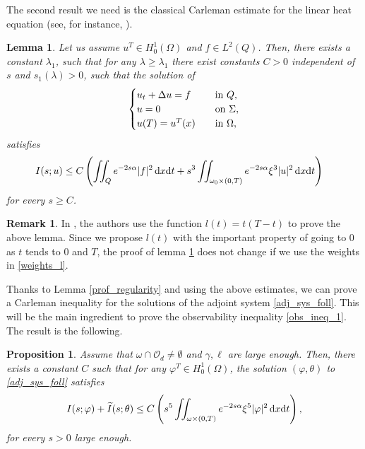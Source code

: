 \documentclass{dcds-bOF}
\newtheorem{lemma}[theorem]{Lemma}
\newtheorem{proposition}{Proposition}
\theoremstyle{definition}
\newtheorem{remark}{Remark}
\def\dx{\,\textnormal{d}x}
\def\dt{\textnormal{d}t}
\begin{document}
The second result we need is the classical Carleman estimate for the linear heat equation (see, for instance, \cite{fursi,cara_guerrero}).
\begin{lemma}\label{2once}
Let us assume $u^T\in H_0^1(\Omega)$ and $f\in L^2(Q)$. Then, there exists a constant $\lambda_1$, such that for any $\lambda\geq \lambda_1$ there exist constants $C>0$ independent of $s$ and $s_1(\lambda)>0$, such that the solution of
%
\begin{equation}\label{sys_u}
\begin{cases}
u_t+\Delta u=f \quad& \textnormal{in } Q, \\
u=0 \quad& \textnormal{on } \Sigma, \\
u(T)=u^T(x) \quad& \textnormal{in } \Omega,
\end{cases}
\end{equation}
%
satisfies
%
\begin{equation}\label{car_clasica}
\begin{split}
I(s;u)\leq C&\left(\iint_Qe^{-2s\alpha}|f|^2\dx\dt+s^3\iint_{\omega_0\times(0,T)}e^{-2s\alpha}\xi^3|u|^2\dx\dt\right)
\end{split}
\end{equation}
%
for every $s\geq C$.
\end{lemma}
%
\begin{remark}
In \cite{fursi,cara_guerrero}, the authors use the function $l(t)=t(T-t)$ to prove the above lemma. Since we propose $l(t)$ with the important property of going to $0$ as $t$ tends to $0$ and $T$, the proof of lemma \ref{2once} does not change if we use the weights in \eqref{weights_l}.
\end{remark}

Thanks to Lemma \ref{prof_regularity} and using the above estimates, we can prove a Carleman inequality for the solutions of the adjoint system \eqref{adj_sys_foll}. This will be the main ingredient to prove the observability inequality \eqref{obs_ineq_1}. The result is the following.
%
\begin{proposition}\label{prop_carleman}
Assume that $\omega\cap\mathcal O_d\neq \emptyset$ and $\gamma,\ell$ are large enough. Then, there exists a constant $C$ such that for any $\varphi^T\in H^1_0(\Omega)$, the solution $(\varphi,\theta)$ to \eqref{adj_sys_foll} satisfies
%
\begin{equation}\label{car_final}
\begin{split}
I(s;\varphi)+\widetilde I(s;\theta) \leq C\left(s^5\iint_{\omega\times(0,T)}e^{-2s\alpha}\xi^5|\varphi|^2\dx\dt\right),
\end{split}
\end{equation}
%
for every $s>0$ large enough.
%
\end{proposition}
\end{document}
